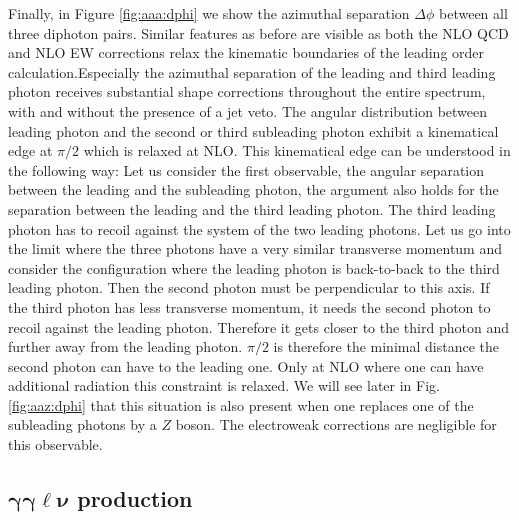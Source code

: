 Finally, in Figure \ref{fig:aaa:dphi} we show the azimuthal 
separation $\Delta\phi$ between all three diphoton pairs. 
Similar features as before are visible as both the NLO QCD 
and NLO EW corrections relax the kinematic boundaries of 
the leading order calculation.Especially the azimuthal separation of the leading and 
third leading photon receives substantial shape corrections 
throughout the entire spectrum, with and without the 
presence of a jet veto. The angular distribution between leading photon
and the second or third subleading photon exhibit a kinematical edge at $\pi/2$ which 
is relaxed at NLO. 
This kinematical edge can be understood in the following way:
 Let us consider the first observable, the angular separation between 
the leading and the subleading photon, the argument also holds for the separation between
the leading and the third leading photon. The third leading photon has to recoil against the
system of the two leading photons. Let us go into the limit where the three photons have
a very similar transverse momentum and consider the configuration where the leading
photon is back-to-back to the third leading photon. Then the second photon must 
be perpendicular to this axis. If the third photon has less transverse momentum, it 
needs the second photon to recoil against the leading photon. Therefore it gets closer
to the third photon and further away from the leading photon. $\pi/2$ is therefore the
minimal distance the second photon can have to the leading one.  Only at NLO where
one can have additional radiation this constraint is relaxed. 
 We will see later in Fig.
\ref{fig:aaz:dphi} that this situation is also present when one replaces one of the subleading
photons by a $Z$ boson. 
The electroweak corrections are negligible for this 
observable.


\subsection[\texorpdfstring{$\gamma\gamma\ell\nu$}{aalnu} production]
           {$\boldsymbol{\gamma\gamma\ell\nu}$ production}
\label{sec:results:aaw}

